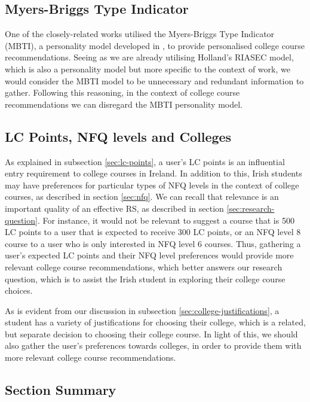 \subsection{Myers-Briggs Type Indicator}

One of the closely-related works utilised the Myers-Briggs Type Indicator (MBTI),
a personality model developed in \cite{myers1962myers},
to provide personalised college course recommendations.
Seeing as we are already utilising Holland's RIASEC model,
which is also a personality model but more specific to the context of work,
we would consider the MBTI model to be unnecessary and redundant information to gather.
Following this reasoning, in the context of college course recommendations we can disregard 
the MBTI personality model.


\subsection{LC Points, NFQ levels and Colleges}
\label{sec:lc-points-nfq-levels-and-colleges}

As explained in subsection \ref{sec:lc-points}, a user's LC points is an influential entry requirement 
to college courses in Ireland.
In addition to this, Irish students may have preferences for particular types of NFQ levels in the context of college courses, as described in section \ref{sec:nfq}.
We can recall that relevance is an important quality of an effective RS, as described in section \ref{sec:research-question}.
For instance, it would not be relevant to suggest a course that is 500 LC points to a user that is expected to 
receive 300 LC points, or an NFQ level 8 course to a user who is only interested in NFQ level 6 courses.
Thus, gathering a user's expected LC points and their NFQ level preferences would provide more relevant
college course recommendations, which better answers our research question, which is to assist the Irish student in exploring their college course choices.

As is evident from our discussion in subsection \ref{sec:college-justifications}, a student has a variety of 
justifications for choosing their college, which is a related, but separate decision to choosing their college course.
In light of this, we should also gather the user's preferences towards colleges,
in order to provide them with more relevant college course recommendations.

\subsection{Section Summary}
\label{sec:user-information-to-profile-summary}

